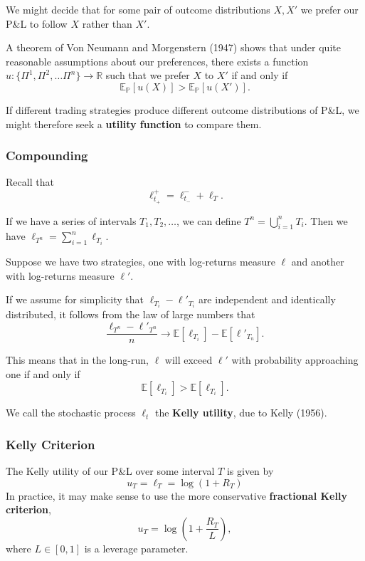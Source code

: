 \documentclass{article}
\begin{document}
We might decide that for some pair of outcome distributions $X,X'$ we prefer our P\&L to follow $X$ rather than $X'$.

A theorem of Von Neumann and Morgenstern (1947) shows that under quite reasonable assumptions about our preferences, there exists a function $u:\{\Pi^1,\Pi^2,\ldots \Pi^n\}\to\mathbb{R}$ such that we prefer $X$ to $X'$ if and only if%
$$\mathbb{E}_\mathbb{P}[u(X)] > \mathbb{E}_\mathbb{P}[u(X')].$$

If different trading strategies produce different outcome distributions of P\&L, we might therefore seek a \textbf{utility function} to compare them.

\subsubsection{Compounding}
Recall that
$$\ell_{t_+}^+ = \ell_{t_-}^- + \ell_T.$$

If we have a series of intervals $T_1,T_2,\ldots$, we can define $T^n=\bigcup_{i=1}^n T_i$. Then we have $\ell_{T^n} = \sum_{i=1}^n \ell_{T_i}$.

Suppose we have two strategies, one with log-returns measure $\ell$ and another with log-returns measure $\ell'$.

If we assume for simplicity that $\ell_{T_i} - \ell'_{T_i}$ are independent and identically distributed, it follows from the law of large numbers that
$$\frac{\ell_{T^n}-\ell'_{T^n}}{n} \to \mathbb{E}[\ell_{T_i}] - \mathbb{E}[\ell'_{T_n}].$$

This means that in the long-run, $\ell$ will exceed $\ell'$ with probability approaching one if and only if
$$\mathbb{E}[\ell_{T_i}]>\mathbb{E}[\ell_{T_i}].$$

We call the stochastic process $\ell_t$ the \textbf{Kelly utility}, due to Kelly (1956).

\subsubsection{Kelly Criterion}
The Kelly utility of our P\&L over some interval $T$ is given by
$$u_T = \ell_T = \log(1 + R_T)$$
In practice, it may make sense to use the more conservative \textbf{fractional Kelly criterion},
$$u_T = \log\left(1 +\frac{R_T}{L}\right),$$
where $L\in [0,1]$ is a leverage parameter.%
\end{document}
